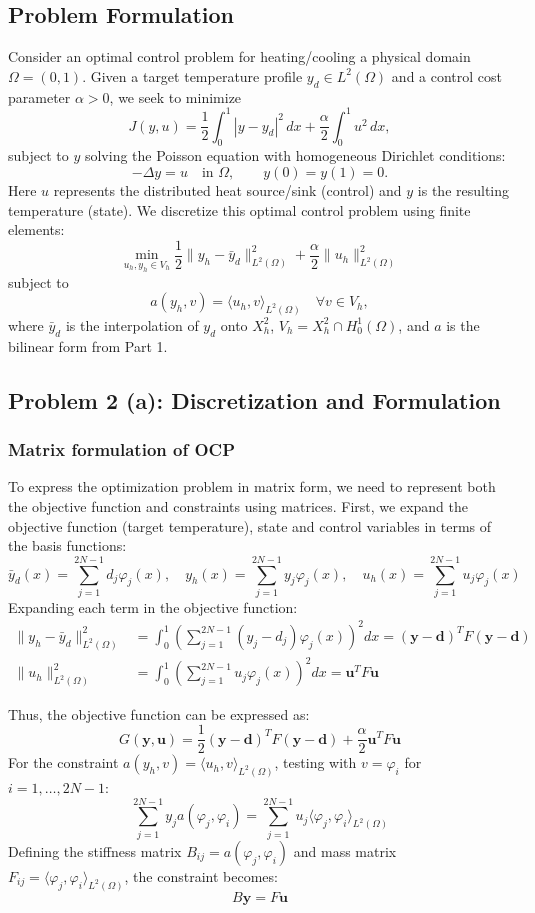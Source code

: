 \documentclass[a4paper,10pt]{article}
\begin{document}
\subsection*{Problem Formulation}
Consider an optimal control problem for heating/cooling a physical domain \(\Omega=(0,1)\).
Given a target temperature profile \(y_d \in L^2(\Omega)\) and a control cost parameter \(\alpha > 0\), we seek to minimize
\[
	J(y,u) = \frac{1}{2}\int_0^1 |y-y_d|^2\,dx + \frac{\alpha}{2}\int_0^1 u^2\,dx,
\]
subject to \(y\) solving the Poisson equation with homogeneous Dirichlet conditions:
\[
	-\Delta y = u \quad\text{in }\Omega, \qquad y(0) = y(1) = 0.
\]
Here \(u\) represents the distributed heat source/sink (control) and \(y\) is the resulting temperature (state).
We discretize this optimal control problem using finite elements:
\[
	\min_{u_h,y_h\in V_h} \frac{1}{2}\|y_h - \bar{y}_d\|^2_{L^2(\Omega)} + \frac{\alpha}{2}\|u_h\|^2_{L^2(\Omega)}
\]
subject to
\[
	a(y_h,v) = \langle u_h,v \rangle_{L^2(\Omega)} \quad \forall v\in V_h,
\]
where \(\bar{y}_d\) is the interpolation of \(y_d\) onto \(X^2_h\), \(V_h = X^2_h \cap H^1_0(\Omega)\), and \(a\) is the bilinear form from Part 1.
\subsection*{Problem 2 (a): Discretization and Formulation}
\subsubsection*{Matrix formulation of OCP}
To express the optimization problem in matrix form, we need to represent both the objective function and constraints using matrices.
First, we expand the objective function (target temperature), state and control variables in terms of the basis functions:
\[
	\bar{y}_d(x) = \sum_{j=1}^{2N-1} d_j \varphi_j(x), \quad
	y_h(x) = \sum_{j=1}^{2N-1} y_j \varphi_j(x), \quad
	u_h(x) = \sum_{j=1}^{2N-1} u_j \varphi_j(x)
\]
Expanding each term in the objective function:
\begin{align*}
	\|y_h - \bar{y}_d\|^2_{L^2(\Omega)} & = \int_0^1 \left(\sum_{j=1}^{2N-1} (y_j-d_j)\varphi_j(x)\right)^2 dx = (\mathbf{y}-\mathbf{d})^T F (\mathbf{y}-\mathbf{d}) \\
	\|u_h\|^2_{L^2(\Omega)}             & = \int_0^1 \left(\sum_{j=1}^{2N-1} u_j \varphi_j(x)\right)^2 dx = \mathbf{u}^T F \mathbf{u}
\end{align*}

Thus, the objective function can be expressed as:
\[
	G(\mathbf{y},\mathbf{u}) = \frac{1}{2}(\mathbf{y}-\mathbf{d})^T F (\mathbf{y}-\mathbf{d}) + \frac{\alpha}{2} \mathbf{u}^T F \mathbf{u}
\]
For the constraint \(a(y_h,v) = \langle u_h,v \rangle_{L^2(\Omega)}\), testing with \(v = \varphi_i\) for \(i=1,\dots,2N-1\):
\[
	\sum_{j=1}^{2N-1} y_j a(\varphi_j,\varphi_i) = \sum_{j=1}^{2N-1} u_j \langle \varphi_j,\varphi_i \rangle_{L^2(\Omega)}
\]
Defining the stiffness matrix \(B_{ij} = a(\varphi_j,\varphi_i)\) and mass matrix \(F_{ij} = \langle \varphi_j,\varphi_i \rangle_{L^2(\Omega)}\), the constraint becomes:
\[
	B \mathbf{y} = F \mathbf{u}
\]
\end{document}
